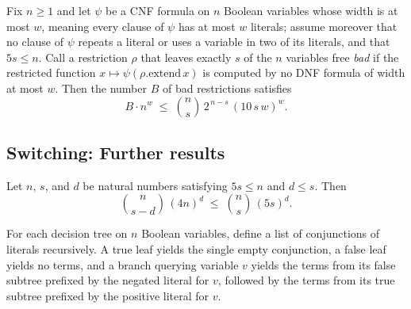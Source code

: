 \begin{theorem}
\label{SwitchingLemmaCNF.switching_corollary_cnf}
\leanok
{}
Fix $n \ge 1$ and let $\psi$ be a CNF formula on $n$ Boolean variables whose width is at
most $w$, meaning every clause of $\psi$ has at most $w$ literals; assume moreover that
no clause of $\psi$ repeats a literal or uses a variable in two of its literals, and
that $5s \le n$. Call a restriction $\rho$ that leaves exactly $s$ of the $n$ variables
free \emph{bad} if the restricted function $x \mapsto \psi(\rho.\mathrm{extend}\,x)$ is
computed by no DNF formula of width at most $w$. Then the number $B$ of bad restrictions
satisfies
\[
  B \cdot n^{w} \;\le\; \binom{n}{s}\, 2^{\,n-s} \, (10\,s\,w)^{w}.
\]
\end{theorem}

\subsection*{Switching: Further results}

\begin{lemma}
\label{SwitchingLemma.choose_mul_pow_bound}
\leanok
{}
Let $n$, $s$, and $d$ be natural numbers satisfying $5s \le n$ and $d \le s$. Then
\[
  \binom{n}{s-d}\,(4n)^d \;\le\; \binom{n}{s}\,(5s)^d .
\]
\end{lemma}

\begin{definition}
\label{SwitchingLemma.toTerms}
\leanok
{}
For each decision tree on $n$ Boolean variables, define a list of conjunctions of
literals recursively. A true leaf yields the single empty conjunction, a false leaf
yields no terms, and a branch querying variable $v$ yields the terms from its false
subtree prefixed by the negated literal for $v$, followed by the terms from its true
subtree prefixed by the positive literal for $v$.
\end{definition}

